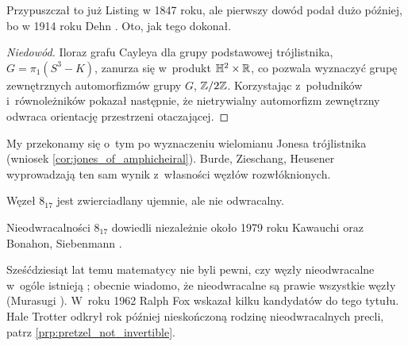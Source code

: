 Przypuszczał to już Listing \cite{listing1847} w 1847 roku, ale pierwszy dowód podał dużo później, bo w 1914 roku Dehn \cite{dehn1914}. 
Oto, jak tego dokonał.
\begin{proof}[Niedowód]
    Iloraz grafu Cayleya dla grupy podstawowej trójlistnika, $G = \pi_1(S^3 - K)$, zanurza się w~produkt $\mathbb H^2 \times \mathbb R$, co pozwala wyznaczyć grupę zewnętrznych automorfizmów grupy $G$, $\mathbb Z/2\mathbb Z$.
Korzystając z~południków i~równoleżników pokazał następnie, że nietrywialny automorfizm zewnętrzny odwraca orientację przestrzeni otaczającej.
\end{proof}

My przekonamy się o~tym po wyznaczeniu wielomianu Jonesa trójlistnika (wniosek \ref{cor:jones_of_amphicheiral}).
Burde, Zieschang, Heusener \cite[s. 79]{burde2014} wyprowadzają ten sam wynik z~własności węzłów rozwłóknionych.

\begin{example}
    Węzeł $8_{17}$ jest zwierciadlany ujemnie, ale nie odwracalny.
\end{example}

Nieodwracalności $8_{17}$ dowiedli niezależnie około 1979 roku Kawauchi \cite{kawauchi1979} oraz Bonahon, Siebenmann \cite{bonahonf1979}.

Sześćdziesiąt lat temu matematycy nie byli pewni, czy węzły nieodwracalne w~ogóle istnieją \cite[problem 10]{fox1962};
obecnie wiadomo, że nieodwracalne są prawie wszystkie węzły (Murasugi \cite[s.~46]{murasugi1996}).
%
W~roku 1962 Ralph Fox wskazał kilku kandydatów do tego tytułu.
%
Hale Trotter odkrył rok później nieskończoną rodzinę nieodwracalnych precli, patrz \ref{prp:pretzel_not_invertible}.
%


